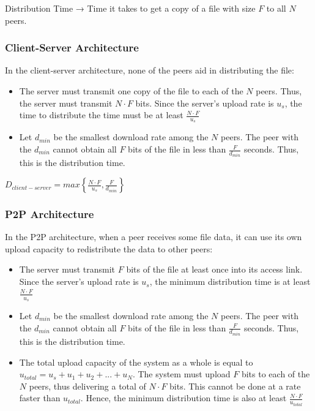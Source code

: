 \documentclass[12pt]{article}
\begin{document}
Distribution Time → Time it takes to get a copy of a file with size $F$ to all $N$ peers.

\subsubsection{Client-Server Architecture}

In the client-server architecture, none of the peers aid in distributing the file:

\begin{itemize}
    \item The server must transmit one copy of the file to each of the $N$ peers. Thus, the server must transmit $N\cdot F$ bits. Since the server's upload rate is $u_s$, the time to distribute the time must be at least $\displaystyle\frac{N\cdot F}{u_s}$
    \item Let $d_{min}$ be the smallest download rate among the $N$ peers. The peer with the $d_{min}$ cannot obtain all $F$ bits of the file in less than $\displaystyle\frac{F}{d_{min}}$ seconds. Thus, this is the distribution time. 
\end{itemize}

\begin{center}
    $\displaystyle D_{client-server}=
    max\left\{\frac{N\cdot F}{u_s},\frac{F}{d_{min}}\right\}$
\end{center}

\subsubsection{P2P Architecture}

In the P2P architecture, when a peer receives some file data, it can use its own upload capacity to redistribute the data to other peers:

\begin{itemize}
    \item The server must transmit $F$ bits of the file at least once into its access link. Since the server's upload rate is $u_s$, the minimum distribution time is at least $\displaystyle\frac{N\cdot F}{u_s}$
    \item Let $d_{min}$ be the smallest download rate among the $N$ peers. The peer with the $d_{min}$ cannot obtain all $F$ bits of the file in less than $\displaystyle\frac{F}{d_{min}}$ seconds. Thus, this is the distribution time.
    \item The total upload capacity of the system as a whole is equal to $u_{total} = u_s + u_1 + u_2+...+u_N$. The system must upload $F$ bits to each of the $N$ peers, thus delivering a total of $N\cdot F$ bits. This cannot be done at a rate faster than $u_{total}$. Hence, the minimum distribution time is also at least
    $\displaystyle\frac{N\cdot F}{u_{total}}$
\end{itemize}
\end{document}
